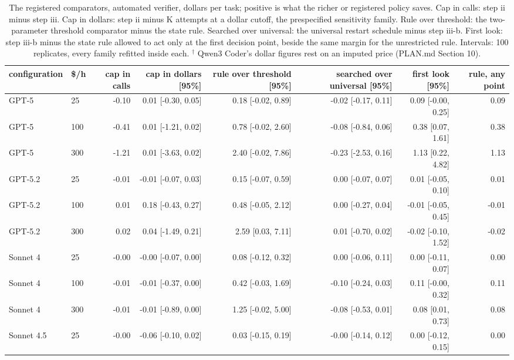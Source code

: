 \begin{table}[t]
\centering
\small
\caption{The registered comparators, automated verifier, dollars per task; positive is what the richer or registered policy saves. Cap in calls: step ii minus step iii. Cap in dollars: step ii minus K attempts at a dollar cutoff, the prespecified sensitivity family. Rule over threshold: the two-parameter threshold comparator minus the state rule. Searched over universal: the universal restart schedule minus step iii-b. First look: step iii-b minus the state rule allowed to act only at the first decision point, beside the same margin for the unrestricted rule. Intervals: 100 replicates, every family refitted inside each. $^\dagger$ Qwen3 Coder's dollar figures rest on an imputed price (PLAN.md Section 10).}
\label{tab:tableA4_comparators}
\begin{tabular}{llrrrrrr}
\toprule
configuration & \$/h & cap in calls & cap in dollars [95\%] & rule over threshold [95\%] & searched over universal [95\%] & first look [95\%] & rule, any point \\
\midrule
GPT-5 & 25 & -0.10 & 0.01 [-0.30, 0.05] & 0.18 [-0.02, 0.89] & -0.02 [-0.17, 0.11] & 0.09 [-0.00, 0.25] & 0.09 \\
GPT-5 & 100 & -0.41 & 0.01 [-1.21, 0.02] & 0.78 [-0.02, 2.60] & -0.08 [-0.84, 0.06] & 0.38 [0.07, 1.61] & 0.38 \\
GPT-5 & 300 & -1.21 & 0.01 [-3.63, 0.02] & 2.40 [-0.02, 7.86] & -0.23 [-2.53, 0.16] & 1.13 [0.22, 4.82] & 1.13 \\
\midrule
GPT-5.2 & 25 & -0.01 & -0.01 [-0.07, 0.03] & 0.15 [-0.07, 0.59] & 0.00 [-0.07, 0.07] & 0.01 [-0.05, 0.10] & 0.01 \\
GPT-5.2 & 100 & 0.01 & 0.18 [-0.43, 0.27] & 0.48 [-0.05, 2.12] & 0.00 [-0.27, 0.04] & -0.01 [-0.05, 0.45] & -0.01 \\
GPT-5.2 & 300 & 0.02 & 0.04 [-1.49, 0.21] & 2.59 [0.03, 7.11] & 0.01 [-0.70, 0.02] & -0.02 [-0.10, 1.52] & -0.02 \\
\midrule
Sonnet 4 & 25 & -0.00 & -0.00 [-0.07, 0.00] & 0.08 [-0.12, 0.32] & 0.00 [-0.06, 0.11] & 0.00 [-0.11, 0.07] & 0.00 \\
Sonnet 4 & 100 & -0.01 & -0.01 [-0.37, 0.00] & 0.42 [-0.03, 1.69] & -0.10 [-0.24, 0.03] & 0.11 [-0.00, 0.32] & 0.11 \\
Sonnet 4 & 300 & -0.01 & -0.01 [-0.89, 0.00] & 1.25 [-0.02, 5.00] & -0.08 [-0.53, 0.01] & 0.08 [0.01, 0.73] & 0.08 \\
\midrule
Sonnet 4.5 & 25 & -0.00 & -0.06 [-0.10, 0.02] & 0.03 [-0.15, 0.19] & -0.00 [-0.14, 0.12] & 0.00 [-0.12, 0.15] & 0.00 \\

\end{tabular}
\end{table}
